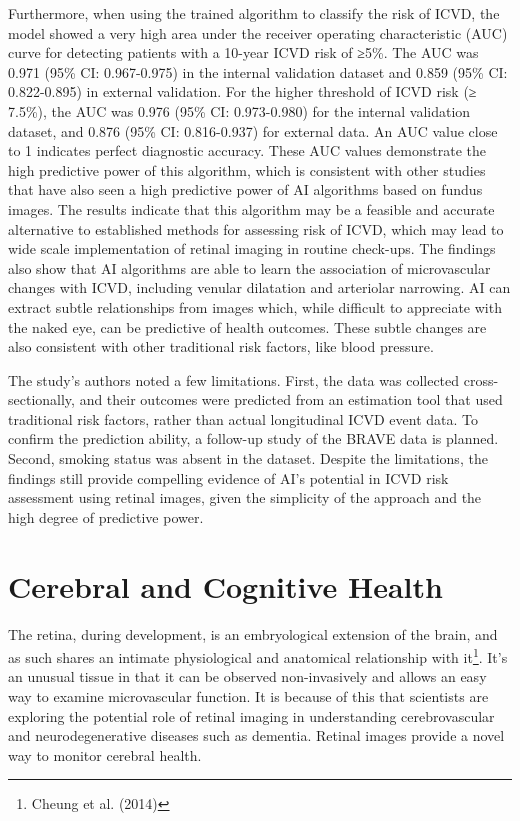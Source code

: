 \documentclass[
  Letterpaper,
]{scrbook}
\begin{document}
Furthermore, when using the trained algorithm to classify the risk of
ICVD, the model showed a very high area under the receiver operating
characteristic (AUC) curve for detecting patients with a 10-year ICVD
risk of ≥5\%. The AUC was 0.971 (95\% CI: 0.967-0.975) in the internal
validation dataset and 0.859 (95\% CI: 0.822-0.895) in external
validation. For the higher threshold of ICVD risk (≥ 7.5\%), the AUC was
0.976 (95\% CI: 0.973-0.980) for the internal validation dataset, and
0.876 (95\% CI: 0.816-0.937) for external data. An AUC value close to 1
indicates perfect diagnostic accuracy. These AUC values demonstrate the
high predictive power of this algorithm, which is consistent with other
studies that have also seen a high predictive power of AI algorithms
based on fundus images. The results indicate that this algorithm may be
a feasible and accurate alternative to established methods for assessing
risk of ICVD, which may lead to wide scale implementation of retinal
imaging in routine check-ups. The findings also show that AI algorithms
are able to learn the association of microvascular changes with ICVD,
including venular dilatation and arteriolar narrowing. AI can extract
subtle relationships from images which, while difficult to appreciate
with the naked eye, can be predictive of health outcomes. These subtle
changes are also consistent with other traditional risk factors, like
blood pressure.

The study's authors noted a few limitations. First, the data was
collected cross-sectionally, and their outcomes were predicted from an
estimation tool that used traditional risk factors, rather than actual
longitudinal ICVD event data. To confirm the prediction ability, a
follow-up study of the BRAVE data is planned. Second, smoking status was
absent in the dataset. Despite the limitations, the findings still
provide compelling evidence of AI's potential in ICVD risk assessment
using retinal images, given the simplicity of the approach and the high
degree of predictive power.

\section{Cerebral and Cognitive
Health}\label{cerebral-and-cognitive-health}

The retina, during development, is an embryological extension of the
brain, and as such shares an intimate physiological and anatomical
relationship with it\footnote{Cheung et al. (2014)}. It's an unusual
tissue in that it can be observed non-invasively and allows an easy way
to examine microvascular function. It is because of this that scientists
are exploring the potential role of retinal imaging in understanding
cerebrovascular and neurodegenerative diseases such as dementia. Retinal
images provide a novel way to monitor cerebral health.
\end{document}

